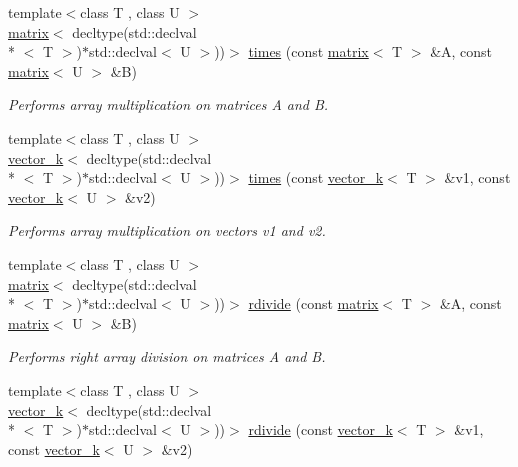 \begin{DoxyCompactItemize}
\item 
{\footnotesize template$<$class T , class U $>$ }\\\hyperlink{classkeycpp_1_1matrix}{matrix}$<$ decltype(std\-::declval\\*
$<$ T $>$)$\ast$std\-::declval$<$ U $>$))$>$ \hyperlink{namespacekeycpp_ac1ff99e34619478096c271b38df1f3d7}{times} (const \hyperlink{classkeycpp_1_1matrix}{matrix}$<$ T $>$ \&A, const \hyperlink{classkeycpp_1_1matrix}{matrix}$<$ U $>$ \&B)
\begin{DoxyCompactList}\small\item\em Performs array multiplication on matrices A and B. \end{DoxyCompactList}\item 
{\footnotesize template$<$class T , class U $>$ }\\\hyperlink{classkeycpp_1_1vector__k}{vector\-\_\-k}$<$ decltype(std\-::declval\\*
$<$ T $>$)$\ast$std\-::declval$<$ U $>$))$>$ \hyperlink{namespacekeycpp_aab613a4c8cc04981045fdea358931780}{times} (const \hyperlink{classkeycpp_1_1vector__k}{vector\-\_\-k}$<$ T $>$ \&v1, const \hyperlink{classkeycpp_1_1vector__k}{vector\-\_\-k}$<$ U $>$ \&v2)
\begin{DoxyCompactList}\small\item\em Performs array multiplication on vectors v1 and v2. \end{DoxyCompactList}\item 
{\footnotesize template$<$class T , class U $>$ }\\\hyperlink{classkeycpp_1_1matrix}{matrix}$<$ decltype(std\-::declval\\*
$<$ T $>$)$\ast$std\-::declval$<$ U $>$))$>$ \hyperlink{namespacekeycpp_aacd37d195541b2313b753b6e8839f916}{rdivide} (const \hyperlink{classkeycpp_1_1matrix}{matrix}$<$ T $>$ \&A, const \hyperlink{classkeycpp_1_1matrix}{matrix}$<$ U $>$ \&B)
\begin{DoxyCompactList}\small\item\em Performs right array division on matrices A and B. \end{DoxyCompactList}\item 
{\footnotesize template$<$class T , class U $>$ }\\\hyperlink{classkeycpp_1_1vector__k}{vector\-\_\-k}$<$ decltype(std\-::declval\\*
$<$ T $>$)$\ast$std\-::declval$<$ U $>$))$>$ \hyperlink{namespacekeycpp_ab299ba9f0640c2f95fe2393f2eef6ed2}{rdivide} (const \hyperlink{classkeycpp_1_1vector__k}{vector\-\_\-k}$<$ T $>$ \&v1, const \hyperlink{classkeycpp_1_1vector__k}{vector\-\_\-k}$<$ U $>$ \&v2)

\end{DoxyCompactItemize}
